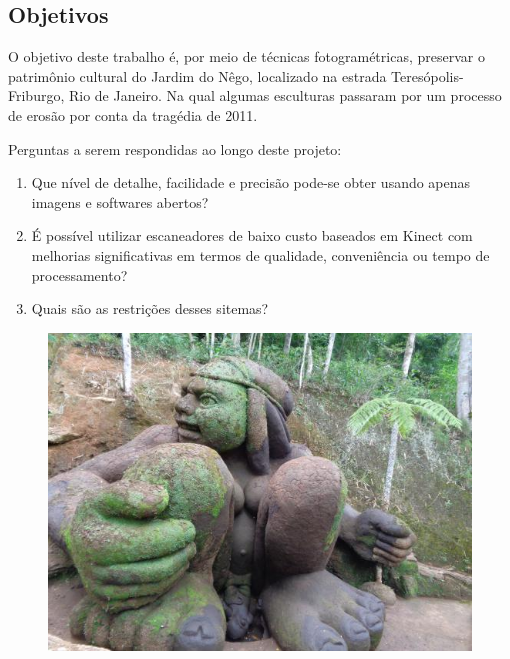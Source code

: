 \documentclass[table, usenames, svgnames, xcolor=dvipsnames]{beamer}
\begin{document}
\subsection{Objetivos}

\begin{frame} 
	\begin{center}
		O objetivo deste trabalho é, por meio de técnicas fotogramétricas, preservar o patrimônio cultural do Jardim do Nêgo, localizado na estrada Teresópolis-Friburgo, Rio de Janeiro. Na qual algumas esculturas passaram por um processo de erosão por conta da tragédia de 2011.
	\end{center}
\end{frame}

\begin{frame}

Perguntas a serem respondidas ao longo deste projeto:

	\begin{enumerate}
	\item {Que nível de detalhe, facilidade e precisão pode-se obter usando apenas imagens e softwares abertos?}
	\item {É possível utilizar escaneadores de baixo custo baseados em Kinect com melhorias significativas em termos de qualidade, conveniência ou tempo de processamento?}
	\item {Quais são as restrições desses sitemas?}
	\end{enumerate}
	
\end{frame}

\begin{frame} 
	\begin{figure}[!h]
		\centering
		\includegraphics[width=0.7\linewidth]{figs/jardim-do-nego.jpg}
	\end{figure}
\end{frame}
\end{document}
